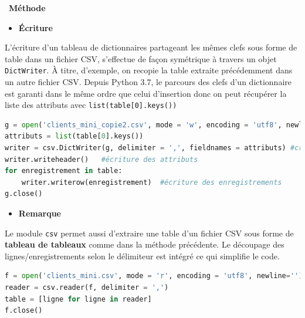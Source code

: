 \documentclass[
  11pt,
]{article}
\newcommand{\passthrough}[1]{#1}
\providecommand{\tightlist}{%
  \setlength{\itemsep}{0pt}\setlength{\parskip}{0pt}}
\newcounter{rque}
\newcounter{cours}
\newenvironment{methode}[1]
{\par \medskip    \noindent  
 \begin {bclogo}[arrondi =0.1,logo=\bcoutil, marge=4,noborder = true] {~\textbf{Méthode}   {\itshape #1} }  \par}
{
\end{bclogo}
 \par \bigskip }
\begin{document}
\begin{methode}{}
\begin{itemize}
\tightlist
\item
  \textbf{Écriture}
\end{itemize}

L'écriture d'un tableau de dictionnaires partageant les mêmes clefs sous
forme de table dans un fichier CSV, s'effectue de façon symétrique à
travers un objet \passthrough{\lstinline!DictWriter!}. À titre,
d'exemple, on recopie la table extraite précédemment dans un autre
fichier CSV. Depuis Python 3.7, le parcours des clefs d'un dictionnaire
est garanti dans le même ordre que celui d'insertion donc on peut
récupérer la liste des attributs avec
\passthrough{\lstinline!list(table[0].keys())!}

\begin{lstlisting}[language=Python]
g = open('clients_mini_copie2.csv', mode = 'w', encoding = 'utf8', newline = '')
attributs = list(table[0].keys())
writer = csv.DictWriter(g, delimiter = ',', fieldnames = attributs) #création de l'objet writer
writer.writeheader()   #écriture des attributs
for enregistrement in table:
    writer.writerow(enregistrement)  #écriture des enregistrements
g.close()
\end{lstlisting}

\begin{itemize}
\tightlist
\item
  \textbf{Remarque}
\end{itemize}

Le module \passthrough{\lstinline!csv!} permet aussi d'extraire une
table d'un fichier CSV sous forme de \textbf{tableau de tableaux} comme
dans la méthode précédente. Le découpage des lignes/enregistrements
selon le délimiteur est intégré ce qui simplifie le code.

\begin{lstlisting}[language=Python]
f = open('clients_mini.csv', mode = 'r', encoding = 'utf8', newline='')
reader = csv.reader(f, delimiter = ',')
table = [ligne for ligne in reader]
f.close()
\end{lstlisting}

\end{methode}
\end{document}
